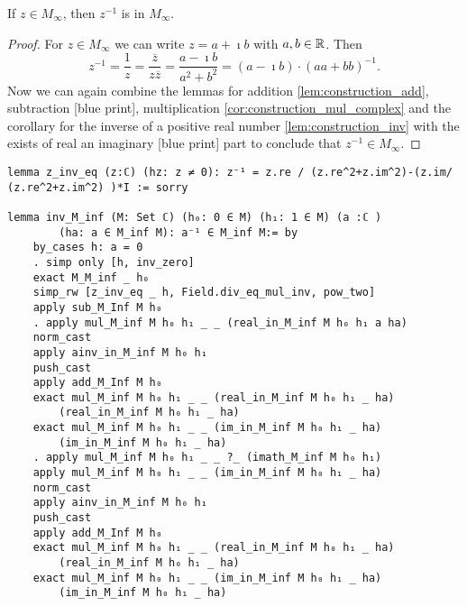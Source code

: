 \begin{corollary}
    \label{cor:inv_M_inf}
    \leanok
    If $z \in M_{\infty}$, then $z^{-1}$ is in  $M_{\infty}$.
\end{corollary}
\begin{proof}
    For $z \in M_{\infty}$ we can write $z = a + \imath b$ with $a, b \in \mathbb{R}$. Then
    $$z^{-1} = \frac{1}{z} = \frac{\overline{z}}{z\overline{z}} = \frac{a - \imath b}{a^2+b^2}= (a - \imath b) \cdot (aa+bb)^{-1}.$$
    Now we can again combine the lemmas for addition \ref{lem:construction_add}, subtraction [blue print], multiplication \ref{cor:construction_mul_complex} and the corollary for the inverse of a positive real number \ref{lem:construction_inv} with the exists of real an imaginary [blue print] part to conclude that $z^{-1} \in M_{\infty}$.
\end{proof}
\begin{lstlisting}
lemma z_inv_eq (z:ℂ) (hz: z ≠ 0): z⁻¹ = z.re / (z.re^2+z.im^2)-(z.im/ (z.re^2+z.im^2) )*I := sorry

lemma inv_M_inf (M: Set ℂ) (h₀: 0 ∈ M) (h₁: 1 ∈ M) (a :ℂ ) 
        (ha: a ∈ M_inf M): a⁻¹ ∈ M_inf M:= by
    by_cases h: a = 0
    . simp only [h, inv_zero]
    exact M_M_inf _ h₀
    simp_rw [z_inv_eq _ h, Field.div_eq_mul_inv, pow_two]
    apply sub_M_Inf M h₀
    . apply mul_M_inf M h₀ h₁ _ _ (real_in_M_inf M h₀ h₁ a ha)
    norm_cast
    apply ainv_in_M_inf M h₀ h₁
    push_cast
    apply add_M_Inf M h₀
    exact mul_M_inf M h₀ h₁ _ _ (real_in_M_inf M h₀ h₁ _ ha) 
        (real_in_M_inf M h₀ h₁ _ ha)
    exact mul_M_inf M h₀ h₁ _ _ (im_in_M_inf M h₀ h₁ _ ha) 
        (im_in_M_inf M h₀ h₁ _ ha)
    . apply mul_M_inf M h₀ h₁ _ _ ?_ (imath_M_inf M h₀ h₁)
    apply mul_M_inf M h₀ h₁ _ _ (im_in_M_inf M h₀ h₁ _ ha)
    norm_cast
    apply ainv_in_M_inf M h₀ h₁
    push_cast
    apply add_M_Inf M h₀
    exact mul_M_inf M h₀ h₁ _ _ (real_in_M_inf M h₀ h₁ _ ha) 
        (real_in_M_inf M h₀ h₁ _ ha)
    exact mul_M_inf M h₀ h₁ _ _ (im_in_M_inf M h₀ h₁ _ ha) 
        (im_in_M_inf M h₀ h₁ _ ha)
\end{lstlisting}
\newpage